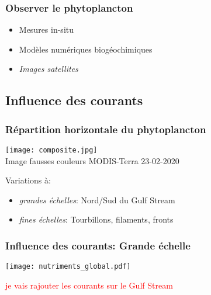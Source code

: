 \begin{frame}
  \frametitle{Observer le phytoplancton}
  {
    \centering
  }

  \begin{itemize}
    \item<2-> Mesures in-situ
    \item<3-> Modèles numériques biogéochimiques
    \item<4-> \emph{Images satellites}
  \end{itemize}
\end{frame}


\subsection{Influence des courants}

\begin{frame}
  \frametitle{Répartition horizontale du phytoplancton}
  \begin{beamercolorbox}[sep=0pt, right]{}
    \texttt{[image: composite.jpg]}
    \\
    {\footnotesize Image fausses couleurs MODIS-Terra 23-02-2020}
  \end{beamercolorbox}

  \vfill

  \begin{beamercolorbox}[sep=0pt]{}
    Variations à:
    \begin{itemize}[<+->]
      \item \emph{grandes échelles}: Nord/Sud du Gulf Stream
      \item \emph{fines échelles}: Tourbillons, filaments, \alert{fronts}
    \end{itemize}
  \end{beamercolorbox}
\end{frame}


\begin{frame}
  \frametitle{Influence des courants: Grande échelle}

  \begin{block}{}
    \texttt{[image: nutriments\_global.pdf]}
  \end{block}
  \textcolor{red}{je vais rajouter les courants sur le Gulf Stream}
\end{frame}

